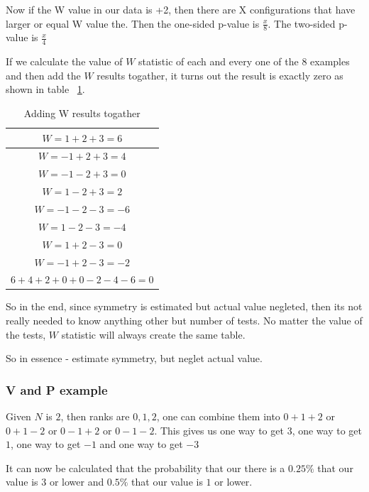 \documentclass[12pt]{article}
\begin{document}
Now if the W value in our data is +2, then there are X configurations that have larger or equal W value the. Then the one-sided p-value is $\frac{x}{8}$. The two-sided p-value is $\frac{x}{4}$

If we calculate the value of $W$ statistic of each and every one of the 8 examples and then add the $W$ results togather, it turns out the result is exactly zero as shown in table ~\ref{table:adding_w_results}.

\begin{table}[!ht]
  \begin{center}
    \caption{Adding W results togather}
      \begin{tabular}{c}
      \hline
      $W = 1 + 2 + 3 = 6$ \\
      \hline
      $W = -1 + 2 + 3 = 4$\\
      \hline
      $W = -1 - 2 + 3 = 0$\\
      \hline
      $W = 1 - 2 + 3 = 2$\\
      \hline
      $W = -1 - 2 - 3 = -6$\\
      \hline
      $W = 1 - 2 - 3 = -4$\\
      \hline
      $W = 1 + 2 - 3 = 0$\\
      \hline
      $W = -1 + 2 - 3 = -2$\\
      \hline
      $6 + 4 + 2 + 0 + 0 -2 - 4 - 6 = 0$\\
      \hline
      \end{tabular}
    \label{table:adding_w_results}
  \end{center}
\end{table}

So in the end, since symmetry is estimated but actual value negleted, then its not really needed to know anything other but number of tests. No matter the value of the tests, $W$ statistic will always create the same table.

So in essence - estimate symmetry, but neglet actual value.

\subsubsection{V and P example}

Given $N$ is $2$, then ranks are ${0, 1, 2}$, one can combine them into $0 + 1 + 2$ or $0 + 1 - 2$ or $0 - 1 + 2$ or $0 - 1 - 2$. This gives us one way to get $3$, one way to get $1$, one way to get $-1$ and one way to get $-3$

It can now be calculated that the probability that our there is a $0.25\%$ that our value is $3$ or lower and $0.5\%$ that our value is $1$ or lower.
\end{document}
